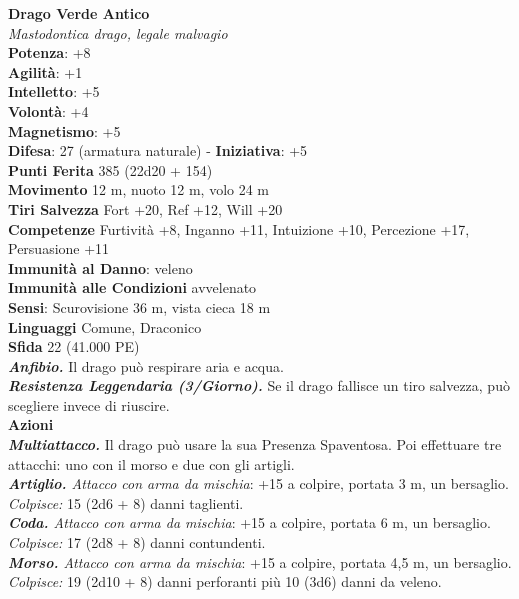 \begin{multicols}{2}
\medskip\textbf{Drago Verde Antico}\\
\emph{Mastodontica drago, legale malvagio} \\
\textbf{Potenza}: +8\\
\textbf{Agilità}: +1\\
\textbf{Intelletto}: +5\\
\textbf{Volontà}: +4\\
\textbf{Magnetismo}: +5\\
\textbf{Difesa}: 27 (armatura naturale) - \textbf{Iniziativa}: +5\\
\textbf{Punti Ferita} 385 (22d20 + 154)\\
\textbf{Movimento} 12 m, nuoto 12 m, volo 24 m\\
\textbf{Tiri Salvezza} Fort +20, Ref +12, Will +20\\
\textbf{Competenze} Furtività +8, Inganno +11, Intuizione +10, Percezione +17, Persuasione +11\\
\textbf{Immunità al Danno}: veleno\\
\textbf{Immunità alle Condizioni} avvelenato\\
\textbf{Sensi}: Scurovisione 36 m, vista cieca 18 m\\
\textbf{Linguaggi} Comune, Draconico\\
\textbf{Sfida} 22 (41.000 PE)\smallskip\\
\emph{\textbf{Anfibio.}} Il drago può respirare aria e acqua.\\
\emph{\textbf{Resistenza Leggendaria (3/Giorno).}} Se il drago fallisce un tiro salvezza, può scegliere invece di riuscire.\\
\smallskip\textbf{Azioni}\\
\emph{\textbf{Multiattacco.}} Il drago può usare la sua Presenza Spaventosa. Poi effettuare tre attacchi: uno con il morso e due con gli artigli.\\
\emph{\textbf{Artiglio.} Attacco con arma da mischia}: +15 a colpire, portata 3 m, un bersaglio.\\
\emph{Colpisce:} 15 (2d6 + 8) danni taglienti.\\
\emph{\textbf{Coda.} Attacco con arma da mischia}: +15 a colpire, portata 6 m, un bersaglio.\\
\emph{Colpisce:} 17 (2d8 + 8) danni contundenti.\\
\emph{\textbf{Morso.} Attacco con arma da mischia}: +15 a colpire, portata 4,5 m, un bersaglio.\\
\emph{Colpisce:} 19 (2d10 + 8) danni perforanti più 10 (3d6) danni da veleno.\\

\end{multicols}
